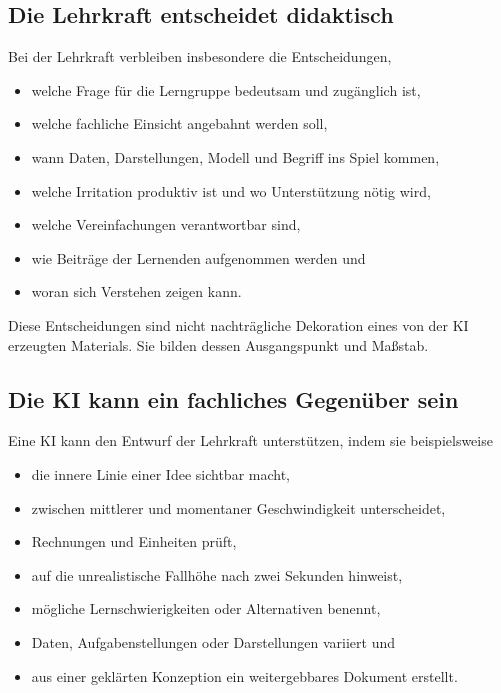 \documentclass[11pt,a4paper]{article}
\begin{document}
\subsection{Die Lehrkraft entscheidet didaktisch}

Bei der Lehrkraft verbleiben insbesondere die Entscheidungen,

\begin{itemize}
  \item welche Frage für die Lerngruppe bedeutsam und zugänglich ist,
  \item welche fachliche Einsicht angebahnt werden soll,
  \item wann Daten, Darstellungen, Modell und Begriff ins Spiel kommen,
  \item welche Irritation produktiv ist und wo Unterstützung nötig wird,
  \item welche Vereinfachungen verantwortbar sind,
  \item wie Beiträge der Lernenden aufgenommen werden und
  \item woran sich Verstehen zeigen kann.
\end{itemize}

Diese Entscheidungen sind nicht nachträgliche Dekoration eines von der KI
erzeugten Materials. Sie bilden dessen Ausgangspunkt und Maßstab.

\subsection{Die KI kann ein fachliches Gegenüber sein}

Eine KI kann den Entwurf der Lehrkraft unterstützen, indem sie beispielsweise

\begin{itemize}
  \item die innere Linie einer Idee sichtbar macht,
  \item zwischen mittlerer und momentaner Geschwindigkeit unterscheidet,
  \item Rechnungen und Einheiten prüft,
  \item auf die unrealistische Fallhöhe nach zwei Sekunden hinweist,
  \item mögliche Lernschwierigkeiten oder Alternativen benennt,
  \item Daten, Aufgabenstellungen oder Darstellungen variiert und
  \item aus einer geklärten Konzeption ein weitergebbares Dokument erstellt.
\end{itemize}
\end{document}

